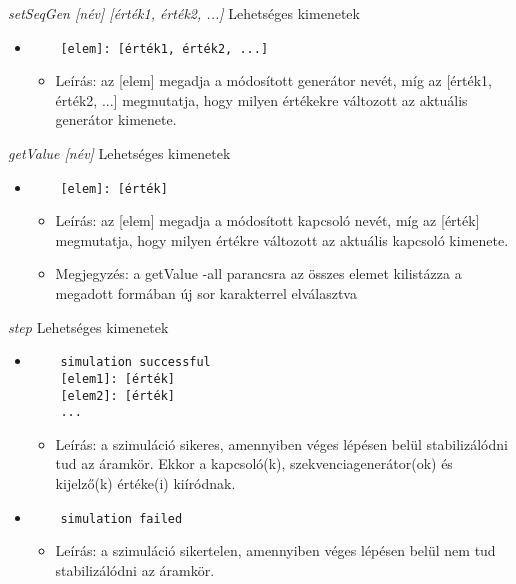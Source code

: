 \textit{setSeqGen [név] [érték1, érték2, ...]}\newline
Lehetséges kimenetek
\begin{itemize}
	\item 
	\begin{verbatim}
	[elem]: [érték1, érték2, ...]
	\end{verbatim}
	\begin{itemize}
		\item Leírás: az [elem] megadja a módosított generátor nevét, míg az [érték1, érték2, ...] megmutatja, hogy milyen értékekre változott az aktuális generátor kimenete. 
	\end{itemize}
\end{itemize}

\textit{getValue [név]}\newline
Lehetséges kimenetek
\begin{itemize}
	\item
	\begin{verbatim}
	[elem]: [érték]
	\end{verbatim}
	\begin{itemize}
		\item Leírás: az [elem] megadja a módosított kapcsoló nevét, míg az [érték] megmutatja, hogy milyen értékre változott az aktuális kapcsoló kimenete.
		\item Megjegyzés: a getValue -all parancsra az összes elemet kilistázza a megadott formában új sor karakterrel elválasztva
	\end{itemize}
\end{itemize}

\textit{step}\newline
Lehetséges kimenetek
\begin{itemize}
	\item
	\begin{verbatim}
	simulation successful
	[elem1]: [érték]
	[elem2]: [érték]
	...
	\end{verbatim}
	\begin{itemize}
		\item Leírás: a szimuláció sikeres, amennyiben véges lépésen belül stabilizálódni tud az áramkör. Ekkor a kapcsoló(k), szekvenciagenerátor(ok) és kijelző(k) értéke(i) kiíródnak.
	\end{itemize}
	\item
	\begin{verbatim}
	simulation failed
	\end{verbatim}
	\begin{itemize}
		\item Leírás: a szimuláció sikertelen, amennyiben véges lépésen belül nem tud stabilizálódni az áramkör.
	\end{itemize}
\end{itemize}

